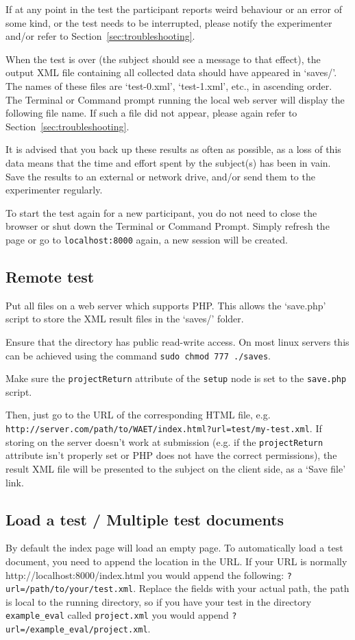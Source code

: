\documentclass[11pt, oneside]{article}   	%
\begin{document}
	        If at any point in the test the participant reports weird behaviour or an error of some kind, or the test needs to be interrupted, please notify the experimenter and/or refer to Section~\ref{sec:troubleshooting}.
			
			When the test is over (the subject should see a message to that effect), the output XML file containing all collected data should have appeared in `saves/'. The names of these files are `test-0.xml', `test-1.xml', etc., in ascending order. The Terminal or Command prompt running the local web server will display the following file name. If such a file did not appear, please again refer to Section~\ref{sec:troubleshooting}. %
			
			It is advised that you back up these results as often as possible, as a loss of this data means that the time and effort spent by the subject(s) has been in vain. Save the results to an external or network drive, and/or send them to the experimenter regularly. 
			
			To start the test again for a new participant, you do not need to close the browser or shut down the Terminal or Command Prompt. Simply refresh the page or go to \texttt{localhost:8000} again, a new session will be created.
		

	\subsection{Remote test}
		Put all files on a web server which supports PHP. This allows the `save.php' script to store the XML result files in the `saves/' folder. 
		
		Ensure that the  directory has public read-write access. On most linux servers this can be achieved using the command \texttt{sudo chmod 777 ./saves}.

		Make sure the \texttt{projectReturn} attribute of the \texttt{setup} node is set to the \texttt{save.php} script. 

		Then, just go to the URL of the corresponding HTML file, e.g. \texttt{http://server.com/path/to/WAET/index.html?url=test/my-test.xml}. If storing on the server doesn't work at submission (e.g. if the \texttt{projectReturn} attribute isn't properly set or PHP does not have the correct permissions), the result XML file will be presented to the subject on the client side, as a `Save file' link. 

    \subsection{Load a test / Multiple test documents}
        By default the index page will load an empty page. To automatically load a test document, you need to append the location in the URL. If your URL is normally http://localhost:8000/index.html you would append the following: \texttt{?url=/path/to/your/test.xml}. Replace the fields with your actual path, the path is local to the running directory, so if you have your test in the directory \texttt{example\_eval} called \texttt{project.xml} you would append \texttt{?url=/example\_eval/project.xml}.
\end{document}
